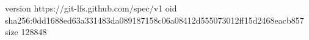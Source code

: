 version https://git-lfs.github.com/spec/v1
oid sha256:0dd1688ed63a331483da089187158c06a08412d555073012ff15d2468eacb857
size 128848
